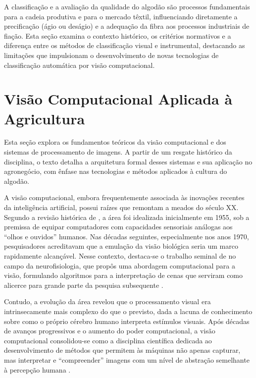 A classificação e a avaliação da qualidade do algodão são processos fundamentais para a cadeia produtiva e para o mercado têxtil, influenciando diretamente a precificação (ágio ou deságio) e a adequação da fibra aos processos industriais de fiação. Esta seção examina o contexto histórico, os critérios normativos e a diferença entre os métodos de classificação visual e instrumental, destacando as limitações que impulsionam o desenvolvimento de novas tecnologias de classificação automática por visão computacional.



\section{Visão Computacional Aplicada à Agricultura}
\label{sec:cv_agricultura}

    Esta seção explora os fundamentos teóricos da visão computacional e dos sistemas de processamento de imagens. A partir de um resgate histórico da disciplina, o texto detalha a arquitetura formal desses sistemas e sua aplicação no agronegócio, com ênfase nas tecnologias e métodos aplicados à cultura do algodão.

    A visão computacional, embora frequentemente associada às inovações recentes da inteligência artificial, possui raízes que remontam a meados do século XX. Segundo a revisão histórica de , a área foi idealizada inicialmente em 1955, sob a premissa de equipar computadores com capacidades sensoriais análogas aos ``olhos e ouvidos'' humanos. Nas décadas seguintes, especialmente nos anos 1970, pesquisadores acreditavam que a emulação da visão biológica seria um marco rapidamente alcançável. Nesse contexto, destaca-se o trabalho seminal de  no campo da neurofisiologia, que propôs uma abordagem computacional para a visão, formulando algoritmos para a interpretação de cenas que serviram como alicerce para grande parte da pesquisa subsequente \cite{vaina2004marr}.

    Contudo, a evolução da área revelou que o processamento visual era intrinsecamente mais complexo do que o previsto, dada a lacuna de conhecimento sobre como o próprio cérebro humano interpreta estímulos visuais. Após décadas de avanços progressivos e o aumento do poder computacional, a visão computacional consolidou-se como a disciplina científica dedicada ao desenvolvimento de métodos que permitem às máquinas não apenas capturar, mas interpretar e ``compreender'' imagens com um nível de abstração semelhante à percepção humana \cite{ballard1982computer}.

